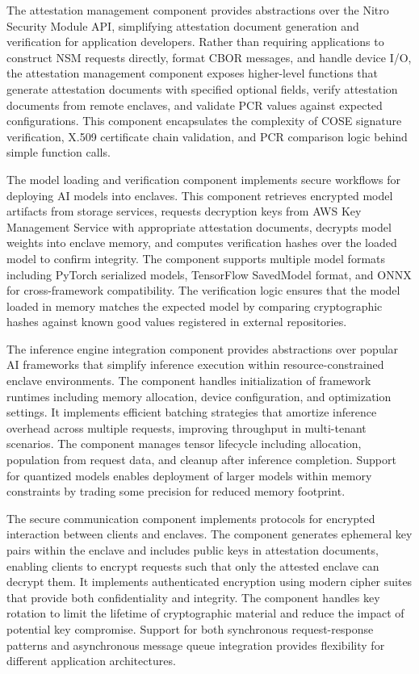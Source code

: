 The attestation management component provides abstractions over the Nitro Security Module API, simplifying attestation document generation and verification for application developers. Rather than requiring applications to construct NSM requests directly, format CBOR messages, and handle device I/O, the attestation management component exposes higher-level functions that generate attestation documents with specified optional fields, verify attestation documents from remote enclaves, and validate PCR values against expected configurations. This component encapsulates the complexity of COSE signature verification, X.509 certificate chain validation, and PCR comparison logic behind simple function calls.

The model loading and verification component implements secure workflows for deploying AI models into enclaves. This component retrieves encrypted model artifacts from storage services, requests decryption keys from AWS Key Management Service with appropriate attestation documents, decrypts model weights into enclave memory, and computes verification hashes over the loaded model to confirm integrity. The component supports multiple model formats including PyTorch serialized models, TensorFlow SavedModel format, and ONNX for cross-framework compatibility. The verification logic ensures that the model loaded in memory matches the expected model by comparing cryptographic hashes against known good values registered in external repositories.

The inference engine integration component provides abstractions over popular AI frameworks that simplify inference execution within resource-constrained enclave environments. The component handles initialization of framework runtimes including memory allocation, device configuration, and optimization settings. It implements efficient batching strategies that amortize inference overhead across multiple requests, improving throughput in multi-tenant scenarios. The component manages tensor lifecycle including allocation, population from request data, and cleanup after inference completion. Support for quantized models enables deployment of larger models within memory constraints by trading some precision for reduced memory footprint.

The secure communication component implements protocols for encrypted interaction between clients and enclaves. The component generates ephemeral key pairs within the enclave and includes public keys in attestation documents, enabling clients to encrypt requests such that only the attested enclave can decrypt them. It implements authenticated encryption using modern cipher suites that provide both confidentiality and integrity. The component handles key rotation to limit the lifetime of cryptographic material and reduce the impact of potential key compromise. Support for both synchronous request-response patterns and asynchronous message queue integration provides flexibility for different application architectures.

